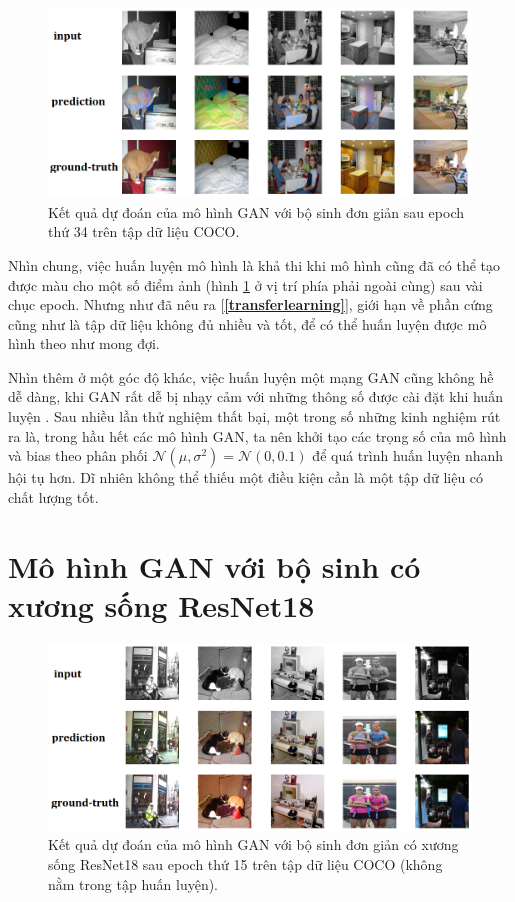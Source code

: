 \documentclass[a4paper, 12pt]{report}
\begin{document}
\begin{figure}[!h]
\captionsetup{width=0.8\textwidth}
\centering
\includegraphics[width=15cm]{images/4_0.png}
\caption{Kết quả dự đoán của mô hình GAN với bộ sinh đơn giản sau epoch thứ 34 trên tập dữ liệu COCO.}
\label{fig:worseexperiment}
\end{figure}

Nhìn chung, việc huấn luyện mô hình là khả thi khi mô hình cũng đã có thể tạo được màu cho một số điểm ảnh (hình \ref{fig:worseexperiment} ở vị trí phía phải ngoài cùng) sau vài chục epoch.
Nhưng như đã nêu ra [\textbf{\ref{transferlearning}}], giới hạn về phần cứng cũng như là tập dữ liệu không đủ nhiều và tốt, để có thể huấn luyện được mô hình theo như mong đợi.\vspace{5pt}

Nhìn thêm ở một góc độ khác, việc huấn luyện một mạng GAN cũng không hề dễ dàng, khi GAN rất dễ bị nhạy cảm với những thông số được cài đặt khi huấn luyện \cite{hard2trainganjonathan2018}.
Sau nhiều lần thử nghiệm thất bại, một trong số những kinh nghiệm rút ra là, trong hầu hết các mô hình GAN, ta nên khởi tạo các trọng số của mô hình và bias theo phân phối $\mathcal{N}\left(\mu, \sigma^2\right) = \mathcal{N}\left(0, 0.1\right)$ để quá trình huấn luyện nhanh hội tụ hơn.
Dĩ nhiên không thể thiếu một điều kiện cần là một tập dữ liệu có chất lượng tốt.

\section{Mô hình GAN với bộ sinh có xương sống ResNet18}

\begin{figure}[!h]
\captionsetup{width=0.8\textwidth}
\centering
\includegraphics[width=15cm]{images/4_1.png}
\caption{Kết quả dự đoán của mô hình GAN với bộ sinh đơn giản có xương sống ResNet18 sau epoch thứ 15 trên tập dữ liệu COCO (không nằm trong tập huấn luyện).}
\label{fig:betterexperiment}
\end{figure}
\end{document}
